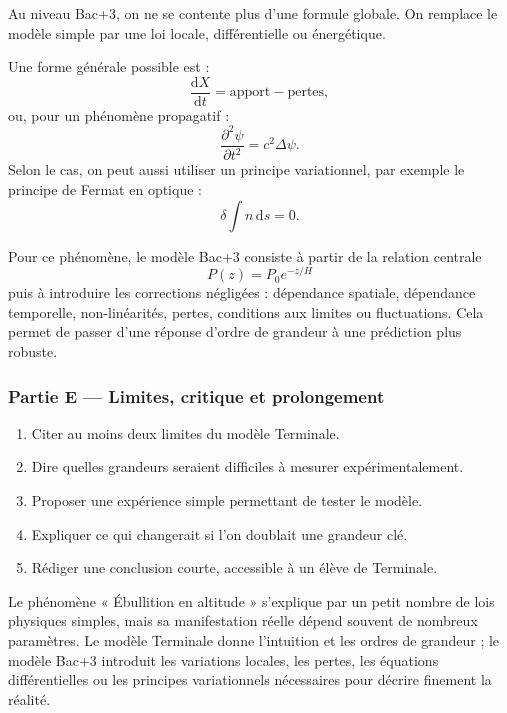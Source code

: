 \documentclass[11pt,a4paper]{article}
\begin{document}
\begin{approfondissementbox}
Au niveau Bac+3, on ne se contente plus d'une formule globale. On remplace le modèle simple par une loi locale, différentielle ou énergétique.

Une forme générale possible est :
\[
\frac{\mathrm d X}{\mathrm dt}=\text{apport}-\text{pertes},
\]
ou, pour un phénomène propagatif :
\[
\frac{\partial^2 \psi}{\partial t^2}=c^2\Delta\psi.
\]
Selon le cas, on peut aussi utiliser un principe variationnel, par exemple le principe de Fermat en optique :
\[
\delta \int n\,\mathrm ds=0.
\]

Pour ce phénomène, le modèle Bac+3 consiste à partir de la relation centrale
\[
P(z)=P_0e^{-z/H}
\]
puis à introduire les corrections négligées : dépendance spatiale, dépendance temporelle, non-linéarités, pertes, conditions aux limites ou fluctuations. Cela permet de passer d'une réponse d'ordre de grandeur à une prédiction plus robuste.
\end{approfondissementbox}

\subsubsection*{Partie E — Limites, critique et prolongement}

\begin{enumerate}
  \item Citer au moins deux limites du modèle Terminale.
  \item Dire quelles grandeurs seraient difficiles à mesurer expérimentalement.
  \item Proposer une expérience simple permettant de tester le modèle.
  \item Expliquer ce qui changerait si l'on doublait une grandeur clé.
  \item Rédiger une conclusion courte, accessible à un élève de Terminale.
\end{enumerate}

\begin{corrigebox}
Le phénomène « Ébullition en altitude » s'explique par un petit nombre de lois physiques simples, mais sa manifestation réelle dépend souvent de nombreux paramètres. Le modèle Terminale donne l'intuition et les ordres de grandeur ; le modèle Bac+3 introduit les variations locales, les pertes, les équations différentielles ou les principes variationnels nécessaires pour décrire finement la réalité.
\end{corrigebox}
\end{document}
